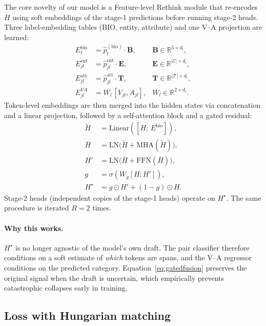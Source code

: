 \documentclass[11pt]{article}
\begin{document}
The core novelty of our model is a Feature-level Rethink module that
re-encodes $H$ using soft embeddings of the stage-1 predictions before
running stage-2 heads. Three label-embedding tables (BIO, entity,
attribute) and one V--A projection are learned:
\begin{align}
E^\text{bio}_t &= \hat p_t^{(\text{bio})} \cdot \mathbf{B}, &
\mathbf{B} \in \mathbb{R}^{5\times d_l}, \\
E^\text{ent}_{jl} &= \hat p^\text{ent}_{jl} \cdot \mathbf{E}, &
\mathbf{E} \in \mathbb{R}^{|\mathcal{E}|\times d_l}, \\
E^\text{att}_{jl} &= \hat p^\text{att}_{jl} \cdot \mathbf{T}, &
\mathbf{T} \in \mathbb{R}^{|\mathcal{T}|\times d_l}, \\
E^{VA}_{jl} &= W_{l}\, [V_{jl}, A_{jl}], &
W_l \in \mathbb{R}^{2\times d_l}.
\end{align}
Token-level embeddings are then merged into the hidden states via
concatenation and a linear projection, followed by a self-attention
block and a gated residual:
\begin{align}
\tilde H &= \mathrm{Linear}([H;\, E^\text{bio}]), \\
\bar H   &= \mathrm{LN}\big(\tilde H + \mathrm{MHA}(\tilde H)\big), \\
H'       &= \mathrm{LN}\big(\bar H + \mathrm{FFN}(\bar H)\big), \\
g        &= \sigma(W_g [H; H']), \\
H^\star  &= g \odot H' + (1-g) \odot H.
\label{eq:gatedfusion}
\end{align}
Stage-2 heads (independent copies of the stage-1 heads) operate on
$H^\star$. The same procedure is iterated $R{=}2$ times.

\paragraph{Why this works.}
$H^\star$ is no longer agnostic of the model's own draft. The pair
classifier therefore conditions on a soft estimate of \emph{which}
tokens are spans, and the V--A regressor conditions on the predicted
category. Equation~\ref{eq:gatedfusion} preserves the original signal
when the draft is uncertain, which empirically prevents catastrophic
collapses early in training.

\subsection{Loss with Hungarian matching}
\label{sec:method:hungarian}
\end{document}
